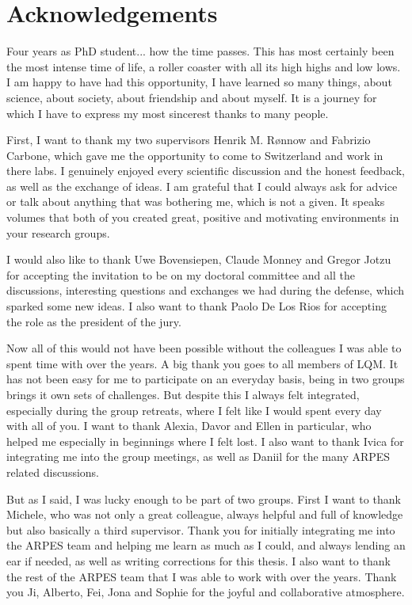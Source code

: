 \chapter*{Acknowledgements}
Four years as PhD student... how the time passes.
This has most certainly been the most intense time of life, a roller coaster with all its high highs and low lows.
I am happy to have had this opportunity, I have learned so many things, about science, about society, about friendship and about myself.
It is a journey for which I have to express my most sincerest thanks to many people.\hfill\break

First, I want to thank my two supervisors Henrik M. R{\o}nnow and Fabrizio Carbone, which gave me the opportunity to come to Switzerland and work in there labs.
I genuinely enjoyed every scientific discussion and the honest feedback, as well as the exchange of ideas.
I am grateful that I could always ask for advice or talk about anything that was bothering me, which is not a given.
It speaks volumes that both of you created great, positive and motivating environments in your research groups.\hfill\break

I would also like to thank Uwe Bovensiepen, Claude Monney and Gregor Jotzu for accepting the invitation to be on my doctoral committee and all the discussions, interesting questions and exchanges we had during the defense, which sparked some new ideas.
I also want to thank Paolo De Los Rios for accepting the role as the president of the jury.\hfill\break

Now all of this would not have been possible without the colleagues I was able to spent time with over the years.
A big thank you goes to all members of LQM.
It has not been easy for me to participate on an everyday basis, being in two groups brings it own sets of challenges.
But despite this I always felt integrated, especially during the group retreats, where I felt like I would spent every day with all of you.
I want to thank Alexia, Davor and Ellen in particular, who helped me especially in beginnings where I felt lost.
I also want to thank Ivica for integrating me into the group meetings, as well as Daniil for the many ARPES related discussions.\hfill\break

But as I said, I was lucky enough to be part of two groups.
First I want to thank Michele, who was not only a great colleague, always helpful and full of knowledge but also basically a third supervisor.
Thank you for initially integrating me into the ARPES team and helping me learn as much as I could, and always lending an ear if needed, as well as writing corrections for this thesis. I also want to thank the rest of the ARPES team that I was able to work with over the years. Thank you Ji, Alberto, Fei, Jona and Sophie for the joyful and collaborative atmosphere.

